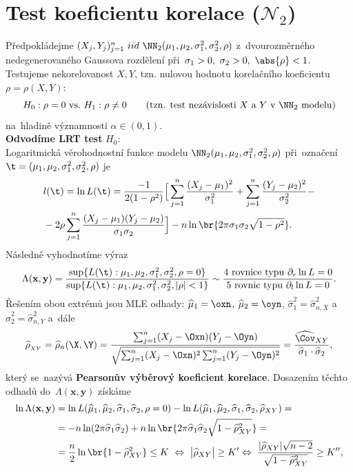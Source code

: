 \section{Test koeficientu korelace ($\mathcal{N}_2$)}
Předpokládejme $ (X_j,Y_j)_{j=1}^n ~iid~\NN_2(\mu_1,\mu_2,\sigma_1^2,\sigma_2^2,\rho)$ z~dvourozměrného nedegenerovaného Gaussova rozdělení při~$\sigma_1>0,~\sigma_2>0,~\abs{\rho}<1$. Testujeme nekorelovanost $X,Y$, tzn. nulovou hodnotu korelačního koeficientu $\rho=\rho(X,Y)$: $$H_0:\rho=0~\text{vs.}~H_1:\rho\neq 0\qquad(\text{tzn. test nezávislosti }X\text{ a~}Y\text{ v~}\NN_2\text{ modelu})$$ na~hladině významnosti $\alpha\in(0,1)$.\\
\textbf{Odvodíme LRT test} $H_0$:\\
Logaritmická věrohodnostní funkce modelu $\NN_2(\mu_1,\mu_2,\sigma_1^2,\sigma_2^2,\rho)$ při~označení $\t=(\mu_1,\mu_2,\sigma_1^2,\sigma_2^2,\rho)$ je 
\[
\begin{split}
&l(\t)=\ln L(\t)=\frac{-1}{2(1-\rho^2)}\Big[ \sum\limits_{j=1}^{n}\frac{(X_j-\mu_1)^2}{\sigma_1^2}+\sum\limits_{j=1}^{n}\frac{(Y_j-\mu_2)^2}{\sigma_2^2}-\\&-2\rho\sum\limits_{j=1}^{n}\frac{(X_j-\mu_1)(Y_j-\mu_2)}{\sigma_1\sigma_2}\Big] -n\ln\br{2\pi\sigma_1\sigma_2\sqrt{1-\rho^2}} . \end{split}
\]
Následně vyhodnotíme výraz
$$ \Lambda(\textbf{x},\textbf{y})=\frac{\sup\{ L(\t):\mu_1,\mu_2,\sigma_1^2,\sigma_2^2,\rho=0 \}}{\sup\{ L(\t):\mu_1,\mu_2,\sigma_1^2,\sigma_2^2,|\rho|<1\}}\sim \frac{\text{4 rovnice typu }\partial_r \ln L=0}{\text{5 rovnic typu }\partial_l\ln L=0}.$$
Řešením obou extrémů jsou MLE odhady: $\widehat{\mu}_1=\oxn$, $\widehat{\mu}_2=\oyn$, $\widehat{\sigma}_1^2=\widehat{\sigma}_{n,X}^2$ a~$\widehat{\sigma}_2^2=\widehat{\sigma}_{n,Y}^2$ a~dále
$$ \widehat{\rho}_{_{XY}}=\widehat{\rho}_{n}(\X,\Y)=\frac{\sum_{j=1}^n (X_j-\Oxn)(Y_j-\Oyn)}{\sqrt{\sum_{j=1}^n(X_j-\Oxn)^2\sum_{j=1}^n(Y_j-\Oyn)^2}}=\frac{\widehat{\Cov}_{XY}}{\widehat{\sigma}_1\cdot\widehat{\sigma}_2}, $$ který se~nazývá \textbf{Pearsonův výběrový koeficient korelace}. Dosazením těchto odhadů do~$\Lambda(\textbf{x},\textbf{y})$ získáme 
\[
\begin{split}
\ln\Lambda(\textbf{x},\textbf{y})&=\ln L(\widehat{\mu}_1,\widehat{\mu}_2,\widehat{\sigma}_1,\widehat{\sigma}_2,\rho=0)-\ln L(\widehat{\mu}_1,\widehat{\mu}_2,\widehat{\sigma}_1,\widehat{\sigma}_2,\widehat{\rho}_{XY})=\\&=-n\ln(2\pi\widehat{\sigma}_1\widehat{\sigma}_2)+n\ln\br{2\pi \widehat{\sigma}_1\widehat{\sigma}_2\sqrt{1-\widehat{\rho}_{XY}^2}}=\\&=\frac{n}{2}\ln\br{1-\widehat{\rho}_{XY}^2}\leq K~\Leftrightarrow~ \big| \widehat{\rho}_{XY} \big|\geq K'\Leftrightarrow~ \frac{|\widehat{\rho}_{XY}|\sqrt{n-2}}{\sqrt{1-\widehat{\rho}_{XY}^2}}\geq K'',
\end{split}
\]
